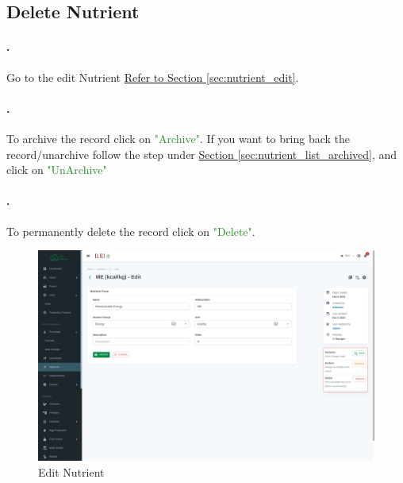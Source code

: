 \subsection{Delete Nutrient }
\setcounter{stepcounter}{1}
\paragraph{.}Go to the edit Nutrient  \hyperref[sec:nutrient_edit]{Refer to Section \ref{sec:nutrient_edit}}.

\paragraph{.}To archive the record click on \textcolor{ForestGreen}{"Archive"}. If you want to bring back the record/unarchive follow the step under \hyperref[sec:nutrient_list_archived]{Section  \ref{sec:nutrient_list_archived}}, and click on \textcolor{ForestGreen}{"UnArchive"}


\paragraph{.}To permanently delete the record click on \textcolor{ForestGreen}{"Delete"}.

\begin{figure}[h!]
  	\includegraphics[width=15cm]{screenshots/nutrient_edit_page.png}
  	\caption{Edit Nutrient }
  	\label{fig:nutrient_edit_page}
\end{figure}